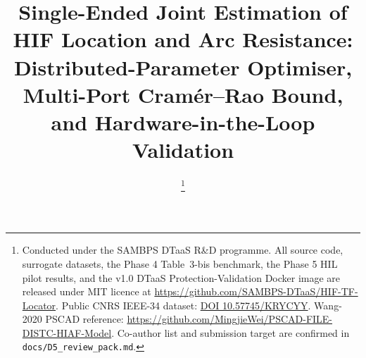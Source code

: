 \documentclass[journal]{IEEEtran}
\begin{document}

\title{Single-Ended Joint Estimation of HIF Location and Arc Resistance:
       Distributed-Parameter Optimiser, Multi-Port Cram\'er--Rao Bound,
       and Hardware-in-the-Loop Validation}

\author{%
  \thanks{Conducted under the SAMBPS DTaaS R\&D programme. All
          source code, surrogate datasets, the Phase 4 Table~3-bis
          benchmark, the Phase 5 HIL pilot results, and the v1.0
          DTaaS Protection-Validation Docker image are released
          under MIT licence at
          \url{https://github.com/SAMBPS-DTaaS/HIF-TF-Locator}.
          Public CNRS IEEE-34 dataset:
          \href{https://doi.org/10.57745/KRYCYY}{DOI 10.57745/KRYCYY}.
          Wang-2020 PSCAD reference:
          \url{https://github.com/MingjieWei/PSCAD-FILE-DISTC-HIAF-Model}.
          Co-author list and submission target are confirmed in
          \texttt{docs/D5\_review\_pack.md}.}%
}

\maketitle
\end{document}
